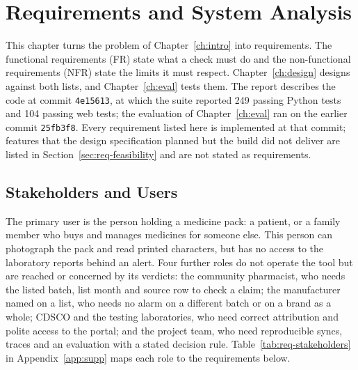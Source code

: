 \chapter{Requirements and System Analysis}
\label{ch:req}

This chapter turns the problem of Chapter~\ref{ch:intro} into requirements. The functional
requirements (FR) state what a check must do and the non-functional requirements (NFR) state the
limits it must respect. Chapter~\ref{ch:design} designs against both lists, and
Chapter~\ref{ch:eval} tests them. The report describes the code at commit \texttt{4e15613}, at which
the suite reported 249 passing Python tests and 104 passing web tests; the evaluation of
Chapter~\ref{ch:eval} ran on the earlier commit \texttt{25fb3f8}. Every requirement listed here is implemented at that commit; features that the design
specification planned but the build did not deliver are listed in Section~\ref{sec:req-feasibility}
and are not stated as requirements.

\section{Stakeholders and Users}
\label{sec:req-stakeholders-and-users}

The primary user is the person holding a medicine pack: a patient, or a family member who buys and
manages medicines for someone else. This person can photograph the pack and read printed
characters, but has no access to the laboratory reports behind an alert. Four further roles do not
operate the tool but are reached or concerned by its verdicts: the community pharmacist, who needs
the listed batch, list month and source row to check a claim; the manufacturer named on a list, who
needs no alarm on a different batch or on a brand as a whole; CDSCO and the testing laboratories,
who need correct attribution and polite access to the portal; and the project team, who need
reproducible syncs, traces and an evaluation with a stated decision rule.
Table~\ref{tab:req-stakeholders} in Appendix~\ref{app:supp} maps each role to the requirements below.

